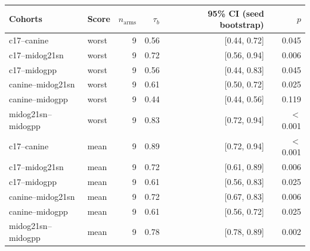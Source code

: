 \begin{tabular}{llrrrr}
\toprule
Cohorts & Score & $n_\text{arms}$ & $\tau_b$ & 95\% CI (seed bootstrap) & $p$ \\
\midrule
c17--canine & worst & 9 & 0.56 & [0.44, 0.72] & 0.045 \\
c17--midog21sn & worst & 9 & 0.72 & [0.56, 0.94] & 0.006 \\
c17--midogpp & worst & 9 & 0.56 & [0.44, 0.83] & 0.045 \\
canine--midog21sn & worst & 9 & 0.61 & [0.50, 0.72] & 0.025 \\
canine--midogpp & worst & 9 & 0.44 & [0.44, 0.56] & 0.119 \\
midog21sn--midogpp & worst & 9 & 0.83 & [0.72, 0.94] & $<$0.001 \\
c17--canine & mean & 9 & 0.89 & [0.72, 0.94] & $<$0.001 \\
c17--midog21sn & mean & 9 & 0.72 & [0.61, 0.89] & 0.006 \\
c17--midogpp & mean & 9 & 0.61 & [0.56, 0.83] & 0.025 \\
canine--midog21sn & mean & 9 & 0.72 & [0.67, 0.83] & 0.006 \\
canine--midogpp & mean & 9 & 0.61 & [0.56, 0.72] & 0.025 \\
midog21sn--midogpp & mean & 9 & 0.78 & [0.78, 0.89] & 0.002 \\
\bottomrule
\end{tabular}
